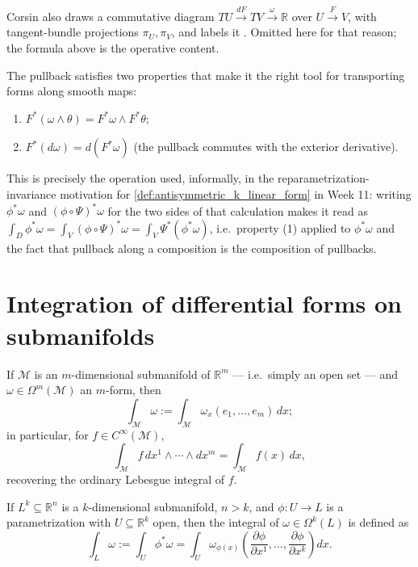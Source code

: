 \begin{ainote}
Corsin also draws a commutative diagram $TU \xrightarrow{dF} TV \xrightarrow{\omega} \mathbb{R}$
over $U \xrightarrow{F} V$, with tangent-bundle projections $\pi_U, \pi_V$, and labels it
. Omitted here for that reason; the formula above is the operative
content.
\end{ainote}

The pullback satisfies two properties that make it the right tool for transporting forms
along smooth maps:
\begin{enumerate}[label=\textbf{(\arabic*)}]
  \item $F^*(\omega\wedge\theta) = F^*\omega \wedge F^*\theta$;
  \item $F^*(d\omega) = d(F^*\omega)$ (the pullback commutes with the exterior derivative).
\end{enumerate}

\begin{ainote}
This is precisely the operation used, informally, in the reparametrization-invariance
motivation for \cref{def:antisymmetric_k_linear_form} in Week 11: writing $\phi^*\omega$ and
$(\phi\circ\Psi)^*\omega$ for the two sides of that calculation makes it read as $\int_D
\phi^*\omega = \int_V (\phi\circ\Psi)^*\omega = \int_V \Psi^*(\phi^*\omega)$, i.e.\ property (1)
applied to $\phi^*\omega$ and the fact that pullback along a composition is the composition of
pullbacks.
\end{ainote}

\section{Integration of differential forms on submanifolds}
\label{sec:integration_of_forms}

If $\mathcal{M}$ is an $m$-dimensional submanifold of $\mathbb{R}^m$ --- i.e.\ simply an open
set --- and $\omega \in \Omega^m(\mathcal{M})$ an $m$-form, then
\[\int_{\mathcal{M}} \omega := \int_{\mathcal{M}} \omega_x(e_1,\ldots,e_m)\,dx;\]
in particular, for $f \in C^\infty(\mathcal{M})$,
\[\int_{\mathcal{M}} f\,dx^1\wedge\cdots\wedge dx^m = \int_{\mathcal{M}} f(x)\,dx,\]
recovering the ordinary Lebesgue integral of $f$.

\begin{definition}
\label{def:integral_of_form_over_submanifold}
If $L^k \subseteq \mathbb{R}^n$ is a $k$-dimensional submanifold, $n>k$, and $\phi : U \to L$
is a parametrization with $U \subseteq \mathbb{R}^k$ open, then the integral of $\omega \in
\Omega^k(L)$ is defined as
\[\int_L \omega := \int_U \phi^*\omega = \int_U \omega_{\phi(x)}\!\left(\frac{\partial\phi}
  {\partial x^1},\ldots,\frac{\partial\phi}{\partial x^k}\right) dx.\]
\end{definition}

